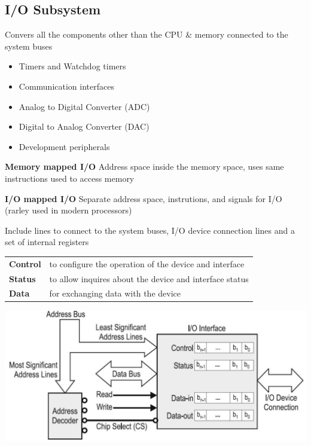 \subsection{I/O Subsystem}
Convers all the components other than the CPU \& memory connected to the system buses
\begin{itemize}
	\item Timers and Watchdog timers
	\item Communication interfaces
	\item Analog to Digital Converter (ADC)
	\item Digital to Analog Converter (DAC)
	\item Development peripherals
\end{itemize}
\begin{multicols}{2}
	\begin{minipage}{\linewidth}
		\textbf{Memory mapped I/O}\newline
		Address space inside the memory space, uses same instructions used to access memory
	\end{minipage}
	
	\begin{minipage}{\linewidth}
		\textbf{I/O mapped I/O} \newline
		Separate address space, instrutions, and signals for I/O (rarley used in modern processors)
	\end{minipage}
\end{multicols}

\begin{minipage}{0.6\linewidth}%
	\raggedright
	Include lines to connect to the system buses, I/O device connection lines and a set of internal registers
	\begin{tabular}{ll}
		\textbf{Control}  & to configure the operation of the device and interface  \\  
		\textbf{Status}   & to allow inquires about the device and interface status  \\ 
		\textbf{Data}     & for exchanging data with the device \\ 
	\end{tabular} 
\end{minipage}
\begin{minipage}{0.4\linewidth}
	\includegraphics[width=\linewidth]{images/IOAnatomy} 
\end{minipage}

\clearpage
